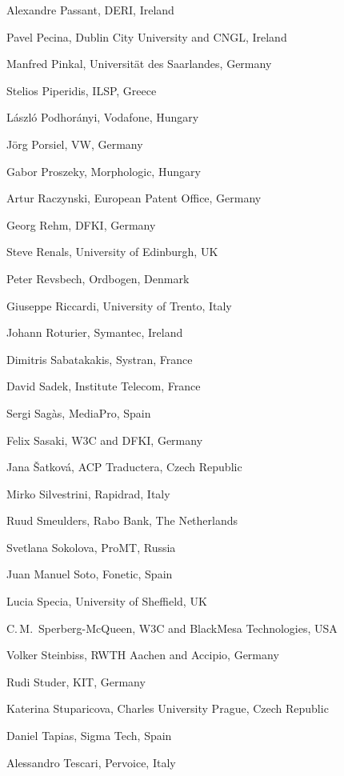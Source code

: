 \documentclass[10pt, plain]{../../metanetpaper}
\begin{document}
\begin{multicols}{3}
\begin{small}
\begin{enumerate}
{      \item Alexandre Passant, DERI, Ireland
      \item Pavel Pecina, Dublin City University and CNGL, Ireland
      \item Manfred Pinkal, Universität des Saarlandes, Germany
      \item Stelios Piperidis, ILSP, Greece
      \item László Podhorányi, Vodafone, Hungary
      \item Jörg Porsiel, VW, Germany
      \item Gabor Proszeky, Morphologic, Hungary
      \item Artur Raczynski, European Patent Office, Germany
      \item Georg Rehm, DFKI, Germany
      \item Steve Renals, University of Edinburgh, UK
      \item Peter Revsbech, Ordbogen, Denmark
      \item Giuseppe Riccardi, University of Trento, Italy
      \item Johann Roturier, Symantec, Ireland
      \item Dimitris Sabatakakis, Systran, France
      \item David Sadek, Institute Telecom, France
      \item Sergi Sagàs, MediaPro, Spain
      \item Felix Sasaki, W3C and DFKI, Germany
      \item Jana Šatková, ACP Traductera, Czech Republic
      \item Mirko Silvestrini, Rapidrad, Italy
      \item Ruud Smeulders, Rabo Bank, The Netherlands
      \item Svetlana Sokolova, ProMT, Russia
      \item Juan Manuel Soto, Fonetic, Spain
      \item Lucia Specia, University of Sheffield, UK
      \item C.\,M.~Sperberg-McQueen, W3C and BlackMesa Technologies, USA
      \item Volker Steinbiss, RWTH Aachen and Accipio, Germany
      \item Rudi Studer, KIT, Germany
      \item Katerina Stuparicova, Charles University Prague, Czech Republic
      \item Daniel Tapias, Sigma Tech, Spain
      \item Alessandro Tescari, Pervoice, Italy
}
\end{enumerate}
\end{small}
\end{multicols}
\end{document}
